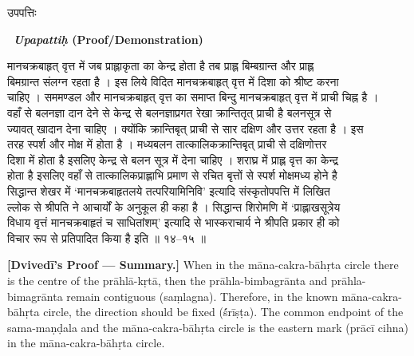 \documentclass[11pt,a4paper]{article}
\newcommand{\dev}[1]{{\devanagarifont #1}}
\newcommand{\bilingualpair}[2]{%
  \noindent%
  \begin{minipage}[t]{0.48\textwidth}
    #1%
  \end{minipage}%
  \hfill%
  \begin{minipage}[t]{0.48\textwidth}
    #2%
  \end{minipage}%
  \par\vspace{0.5em}%
}
\newenvironment{sanskritcol}{\devanagarifont\small}{}
\newenvironment{englishcol}{\iastfont\small}{}
\begin{document}
{\begin{englishcol}
\end{englishcol}%
}

\vspace{0.5cm}
\bilingualpair{%
\begin{sanskritcol}
\dev{उपपत्तिः}
\end{sanskritcol}%
}{%
\begin{englishcol}
\textbf{\textbar\ \textit{Upapattiḥ} (Proof/Demonstration)}
\end{englishcol}%
}

\bilingualpair{%
\begin{sanskritcol}
\dev{मानचक्रबाहृत् वृत्त में जब प्राह्लाकृता का केन्द्र होता है तब प्राह्ल बिम्बग्रान्त और प्राह्ल}\\[0.3em]
\dev{बिमग्रान्त संलग्न रहता है । इस लिये विदित मानचक्रबाहृत् वृत्त में दिशा को श्रीष्ट करना}\\[0.3em]
\dev{चाहिए । सममण्डल और मानचक्रबाहृत् वृत्त का समाप्त बिन्दु मानचक्रबाहृत् वृत्त में प्राची चिह्न है ।}\\[0.3em]
\dev{वहाँ से बलनज्ञा दान देने से केन्द्र से बलनज्ञाप्रगत रेखा क्रान्तितृत् प्राची है बलनसूत्र से}\\[0.3em]
\dev{ज्यावत् खादान देना चाहिए । क्योंकि क्रान्तिबृत् प्राची से सार दक्षिण और उत्तर रहता है । इस}\\[0.3em]
\dev{तरह स्पर्श और मोक्ष में होता है । मध्यबलन तात्कालिकक्रान्तिबृत् प्राची से दक्षिणोत्तर}\\[0.3em]
\dev{दिशा में होता है इसलिए केन्द्र से बलन सूत्र में देना चाहिए । शराघ्र में प्राह्ल वृत्त का केन्द्र}\\[0.3em]
\dev{होता है इसलिए वहाँ से तात्कालिकप्राह्लाभि प्रमाण से रचित बृत्तों से स्पर्श मोक्षमध्य होने है}\\[0.3em]
\dev{सिद्धान्त शेखर में `मानचक्रबाहृतलये तत्परियामिनिवि' इत्यादि संस्कृतोपपत्ति में लिखित}\\[0.3em]
\dev{ल्लोक से श्रीपति ने आचार्यों के अनुकूल ही कहा है । सिद्धान्त शिरोमणि में `प्राह्लाखसूत्रेय}\\[0.3em]
\dev{विधाय वृत्तं मानचक्रबाहृतं च साधितांशम्' इत्यादि से भास्कराचार्य ने श्रीपति प्रकार ही को}\\[0.3em]
\dev{विचार रूप से प्रतिपादित किया है इति ॥ १४--१५ ॥}
\end{sanskritcol}%
}{%
\begin{englishcol}
\textbf{[Dvivedī's Proof --- Summary.]} When in the māna-cakra-bāhṛta circle there is the centre of the prāhlā-kṛtā, then the prāhla-bimbagrānta and prāhla-bimagrānta remain contiguous (saṃlagna). Therefore, in the known māna-cakra-bāhṛta circle, the direction should be fixed (\'śrīṣṭa). The common endpoint of the sama-maṇḍala and the māna-cakra-bāhṛta circle is the eastern mark (prācī cihna) in the māna-cakra-bāhṛta circle.\\[0.3em]

\end{englishcol}}
\end{document}
